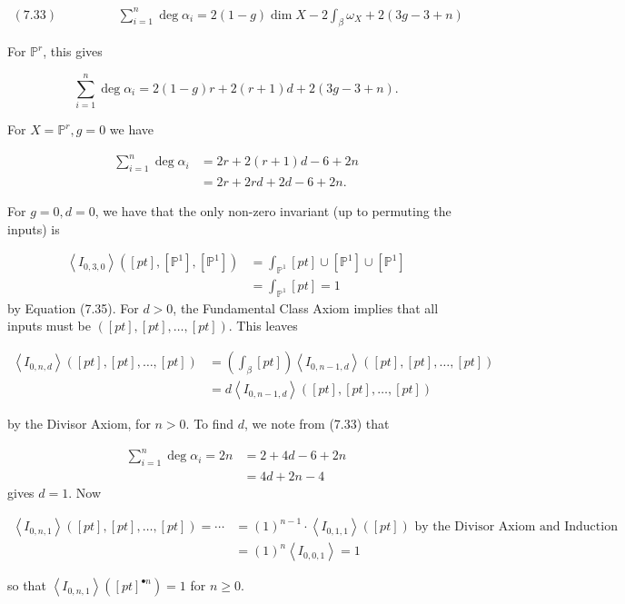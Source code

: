\documentclass{amsart}
\newcommand{\PP}{\mathbb{P}}\newcommand{\A}{\mathbb{A}}\newcommand{\Z}{\mathbb{Z}}\newcommand{\C}{\mathbb{C}}\newcommand{\N}{\mathbb{N}}\newcommand{\T}{\mathbb{T}}
\begin{document}
\begin{align*}
(7.33) \hspace{2cm} \sum_{i=1}^n \deg\alpha_i = 2(1-g)\dim X - 2\int_\beta \omega_X + 2(3g-3+n)\end{align*}

For $\PP^r$, this gives

\[ \sum_{i=1}^n \deg \alpha_i = 2(1-g)r + 2(r+1)d + 2(3g-3+n).\]

For $X=\PP^r, g=0$ we have

\begin{align*}
    \sum_{i=1}^n \deg\alpha_i &= 2r +2(r+1)d -6 + 2n\\
    &= 2r + 2rd + 2d -6 + 2n.
\end{align*}

For $g=0,d=0$, we have that the only non-zero invariant (up to permuting the inputs) is 

\begin{align*}
    \left<I_{0,3,0}\right>([pt], [\PP^1], [\PP^1]) &=\int_{\PP^1} [pt] \cup [\PP^1] \cup [\PP^1]\\
    &= \int_{\PP^1}[pt] = 1
\end{align*} by Equation (7.35). For $d>0$, the Fundamental Class Axiom implies that all inputs must be $([pt],[pt],\dots, [pt])$. This leaves

\begin{align*}
    \left< I_{0,n,d}\right>([pt],[pt],\dots,[pt]) &= \left( \int_\beta [pt] \right) \left< I_{0,n-1,d}\right> ([pt],[pt],\dots,[pt])\\
    &= d \left< I_{0,n-1,d}\right>([pt],[pt],\dots,[pt])
\end{align*}


by the Divisor Axiom, for $n>0$. To find $d$, we note from (7.33) that

\begin{align*}
    \sum_{i=1}^n \deg\alpha_i = 2n &= 2 + 4d - 6 + 2n\\
    &= 4d + 2n - 4
\end{align*} gives $d=1$. Now

\begin{align*}
 \left<I_{0,n,1}\right>([pt],[pt],\dots,[pt]) = \cdots &= (1)^{n-1}\cdot \left<I_{0,1,1}\right>([pt]) \text{ by the Divisor Axiom and Induction}\\
 &= (1)^n \left< I_{0,0,1} \right> = 1
 \end{align*} 

 so that $\left<I_{0,n,1}\right>([pt]^{\bullet n}) = 1$ for $n\geq 0$. 
\end{document}
